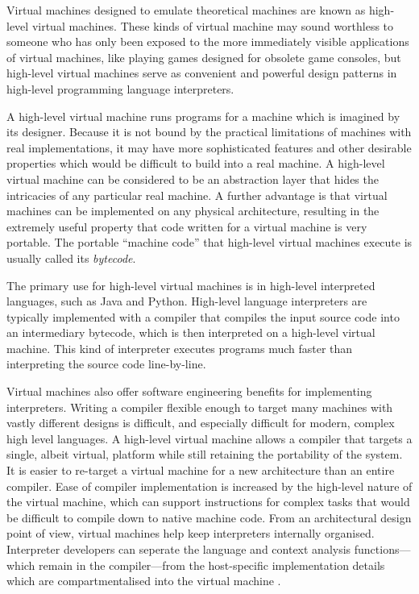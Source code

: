 		Virtual machines designed to emulate theoretical machines are known as high-level virtual machines. These kinds of virtual machine may sound worthless to someone who has only been exposed to the more immediately visible applications of virtual machines, like playing games designed for obsolete game consoles, but high-level virtual machines serve as convenient and powerful design patterns in high-level programming language interpreters.
		
		A high-level virtual machine runs programs for a machine which is imagined by its designer. Because it is not bound by the practical limitations of machines with real implementations, it may have more sophisticated features and other desirable properties which would be difficult to build into a real machine. A high-level virtual machine can be considered to be an abstraction layer that hides the intricacies of any particular real machine. A further advantage is that virtual machines can be implemented on any physical architecture, resulting in the extremely useful property that code written for a virtual machine is very portable. The portable ``machine code'' that high-level virtual machines execute is usually called its \emph{bytecode}. 
		
		The primary use for high-level virtual machines is in high-level interpreted languages, such as Java and Python. High-level language interpreters are typically implemented with a compiler that compiles the input source code into an intermediary bytecode, which is then interpreted on a high-level virtual machine. This kind of interpreter executes programs much faster than interpreting the source code line-by-line.
		
		Virtual machines also offer software engineering benefits for implementing interpreters. Writing a compiler flexible enough to target many machines with vastly different designs is difficult, and especially difficult for modern, complex high level languages. A high-level virtual machine allows a compiler that targets a single, albeit virtual, platform while still retaining the portability of the system. It is easier to re-target a virtual machine for a new architecture than an entire compiler. Ease of compiler implementation is increased by the high-level nature of the virtual machine, which can support instructions for complex tasks that would be difficult to compile down to native machine code. From an architectural design point of view, virtual machines help keep interpreters internally organised. Interpreter developers can seperate the language and context analysis functions---which remain in the compiler---from the host-specific implementation details which are compartmentalised into the virtual machine \citep{structureinterpreters}.
		
